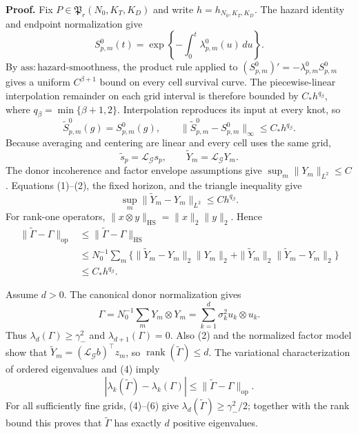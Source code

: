 \textbf{Proof.}
Fix \(P\in\mathfrak P_r(N_0,K_T,K_D)\) and write \(h=h_{N_0,K_T,K_D}\). The hazard identity and endpoint normalization give
\[
 S^0_{p,m}(t)=\exp\left\{-\int_0^t\lambda^0_{p,m}(u)\,du\right\}.
\]
By \(\mathrm{ass:hazard\mbox{-}smoothness}\), the product rule applied to \((S^0_{p,m})'=-\lambda^0_{p,m}S^0_{p,m}\) gives a uniform \(C^{\beta+1}\) bound on every cell survival curve. The piecewise-linear interpolation remainder on each grid interval is therefore bounded by \(C_*h^{q_\beta}\), where \(q_\beta=\min\{\beta+1,2\}\). Interpolation reproduces its input at every knot, so
\[
 \widetilde S^0_{p,m}(g)=S^0_{p,m}(g),
 \qquad
 \|\widetilde S^0_{p,m}-S^0_{p,m}\|_\infty\le C_*h^{q_\beta}. \tag{1}
\]
Because averaging and centering are linear and every cell uses the same grid,
\[
 \widetilde s_p=\mathcal L_{\mathcal G}s_p,
 \qquad
 \widetilde Y_m=\mathcal L_{\mathcal G}Y_m. \tag{2}
\]
The donor incoherence and factor envelope assumptions give \(\sup_m\|Y_m\|_{L^2}\le C\). Equations (1)--(2), the fixed horizon, and the triangle inequality give
\[
 \sup_m\|\widetilde Y_m-Y_m\|_{L^2}\le C h^{q_\beta}. \tag{3}
\]
For rank-one operators, \(\|x\otimes y\|_{\mathrm{HS}}=\|x\|_2\|y\|_2\). Hence
\[
 \begin{split}
 \|\widetilde\Gamma-\Gamma\|_{\mathrm{op}}
 &\le \|\widetilde\Gamma-\Gamma\|_{\mathrm{HS}}\\
 &\le N_0^{-1}\sum_m
 \{\|\widetilde Y_m-Y_m\|_2\|Y_m\|_2
   +\|\widetilde Y_m\|_2\|\widetilde Y_m-Y_m\|_2\}\\
 &\le C_*h^{q_\beta}. \tag{4}
 \end{split}
\]

Assume \(d>0\). The canonical donor normalization gives
\[
 \Gamma=N_0^{-1}\sum_mY_m\otimes Y_m
       =\sum_{k=1}^d\sigma_k^2u_k\otimes u_k. \tag{5}
\]
Thus \(\lambda_d(\Gamma)\ge\gamma_-^2\) and \(\lambda_{d+1}(\Gamma)=0\). Also (2) and the normalized factor model show that \(\widetilde Y_m=(\mathcal L_{\mathcal G}b)^{\top}z_m\), so \(\operatorname{rank}(\widetilde\Gamma)\le d\). The variational characterization of ordered eigenvalues and (4) imply
\[
 |\lambda_k(\widetilde\Gamma)-\lambda_k(\Gamma)|
 \le\|\widetilde\Gamma-\Gamma\|_{\mathrm{op}}. \tag{6}
\]
For all sufficiently fine grids, (4)--(6) give \(\lambda_d(\widetilde\Gamma)\ge\gamma_-^2/2\); together with the rank bound this proves that \(\widetilde\Gamma\) has exactly \(d\) positive eigenvalues.

